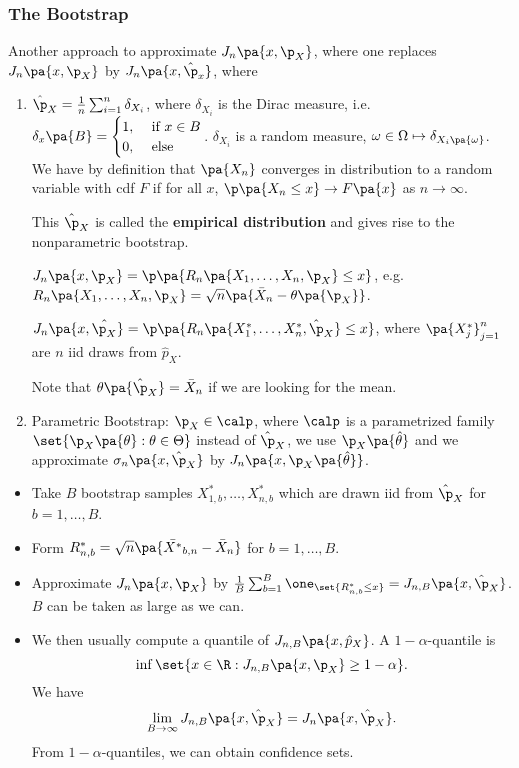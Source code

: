 \subsubsection{The Bootstrap}
Another approach to approximate $J_n \pa{x,\p_X}$, where one replaces $J_n\pa{x,\p_X}$ by $J_n\pa{x,\hat{\p}_x}$, where
\renewcommand{\labelenumi}{\alph{enumi})}
\begin{enumerate}
  \item $\hat{\p}_X = \frac{1}{n}\sum_{i=1}^n \delta_{X_i}$, where $\delta_{X_i}$ is the Dirac measure, i.e.~$\delta_x\pa{B}= \begin{cases} 1 ,&\text{ if } x\in B\\ 0,&\text{ else}\end{cases}$. $\delta_{X_i}$ is a random measure, $\omega\in \Omega \mapsto \delta_{X_i\pa{\omega}}$. We have by definition that $\pa{X_n}$ converges in distribution to a random variable with cdf $F$ if for all $x$, $\p\pa{X_n\leq x}\rightarrow F\pa{x}$ as $n\rightarrow \infty$.

  This $\hat{\p}_X$ is called the \textbf{empirical distribution} and gives rise to the nonparametric bootstrap.

    $J_n\pa{x,\p_X} = \p\pa{R_n \pa{X_1,\ldots, X_n,\p_X}\leq x}$, e.g.~$R_n\pa{X_1,\ldots, X_n,\p_X}= \sqrt{n} \pa{\bar{X}_n - \theta\pa{\p_X}}$.

    $J_n \pa{x,\hat{\p_X}} = \p\pa{R_n \pa{X_1^\ast,\ldots, X_n^\ast,\hat{\p}_X}\leq x}$, where $\pa{X_j^\ast}_{j=1}^n$ are $n$ iid draws from $\hat{p}_X$.

    Note that $\theta\pa{\hat{\p}_X} = \bar{X}_n$ if we are looking for the mean.
  \item Parametric Bootstrap: $\p_X\in \calp$, where $\calp$ is a parametrized family $\set{\p_X\pa{\theta} : \theta \in \Theta}$ instead of $\hat{\p}_X$, we use $\p_X\pa{\hat{\theta}}$ and we approximate $\sigma_n\pa{x,\hat{\p}_X}$ by $J_n \pa{x,\p_X\pa{\hat{\theta}}}$.
\end{enumerate}
\begin{itemize}
\item Take $B$ bootstrap samples $X_{1,b}^\ast, \ldots, X_{n,b}^\ast$ which are drawn iid from $\hat{\p}_X$ for $b=1,\ldots, B$.
\item Form $R_{n,b}^\ast = \sqrt{n}\pa{\bar{X^\ast}_{b,n}-\bar{X}_n}$ for $b=1,\ldots, B$.
\item Approximate $J_n \pa{x,\p_X}$ by $\frac{1}{B}\sum_{b=1}^B \one_{\set{R^\ast_{n,b} \leq x}} = J_{n,B}\pa{x,\hat{\p}_X}$. $B$ can be taken as large as we can.
\item We then usually compute a quantile of $J_{n,B}\pa{x,\hat{p}_X}$. A $1-\alpha$-quantile is
\begin{equation}
  \inf\set{x\in \R: J_{n,B} \pa{x,\p_X}\geq 1-\alpha}.
\end{equation}
We have
\begin{equation}
  \lim_{B\rightarrow \infty} J_{n,B}\pa{x,\hat{\p}_X} = J_n\pa{x,\hat{\p}_X}.
\end{equation}
From $1-\alpha$-quantiles, we can obtain confidence sets.
\end{itemize}

